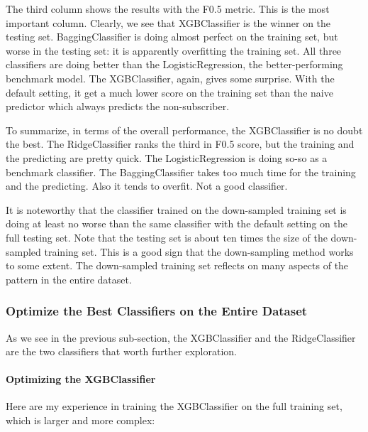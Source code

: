 \documentclass[a4paper]{article}
\begin{document}
			The third column shows the results with the F0.5 metric. This is the most important column. Clearly, we see that XGBClassifier is the winner on the testing set. BaggingClassifier is doing almost perfect on the training set, but worse in the testing set: it is apparently overfitting the training set. All three classifiers are doing better than the LogisticRegression, the better-performing benchmark model. The XGBClassifier, again, gives some surprise. With the default setting, it get a much lower score on the training set than the naive predictor which always predicts the non-subscriber.
			
			To summarize, in terms of the overall performance, the XGBClassifier is no doubt the best. The RidgeClassifier ranks the third in F0.5 score, but the training and the predicting are pretty quick. The LogisticRegression is doing so-so as a benchmark classifier. The BaggingClassifier takes too much time for the training and the predicting. Also it tends to overfit. Not a good classifier. 

			It is noteworthy that the classifier trained on the down-sampled training set is doing at least no worse than the same classifier with the default setting on the full testing set. Note that the testing set is about ten times the size of the down-sampled training set. This is a good sign that the down-sampling method works to some extent. The down-sampled training set reflects on many aspects of the pattern in the entire dataset. 
		
			\subsubsection{Optimize the Best Classifiers on the Entire Dataset}			
			As we see in the previous sub-section, the XGBClassifier and the RidgeClassifier are the two classifiers that worth further exploration.
			
			\paragraph{Optimizing the XGBClassifier}
			Here are my experience in training the XGBClassifier on the full training set, which is larger and more complex:
			
\end{document}
